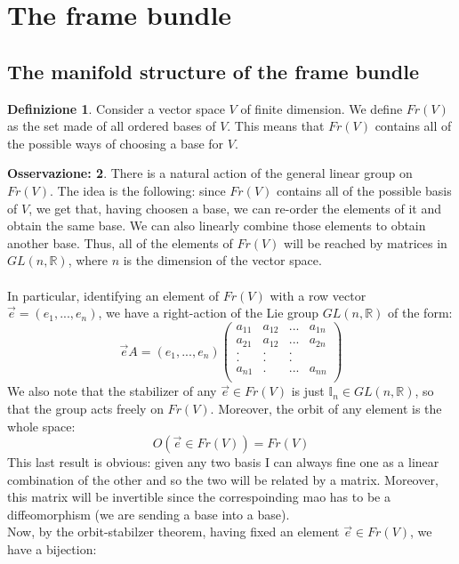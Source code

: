 \documentclass[12pt,a4paper]{report}
\theoremstyle{definition}
\newtheorem{Def}{Definizione}[chapter]
\theoremstyle{Theorem}
\theoremstyle{definition}
\theoremstyle{definition}
\theoremstyle{definition}
\newtheorem{Obs}[Def]{Osservazione:}
\begin{document}
	\section{The frame bundle}
	\subsection{The manifold structure of the frame bundle}
	\begin{Def}\label{Def_6.5}
		Consider a vector space $V$ of finite dimension. We define $Fr(V)$ as the set made of all ordered bases of $V$. This means that $Fr(V)$ contains all of the possible ways of choosing a base for $V$.
	\end{Def}
	\begin{Obs}
		There is a natural action of the general linear group on $Fr(V)$. The idea is the following: since $Fr(V)$ contains all of the possible basis of $V$, we get that, having choosen a base, we can re-order the elements of it and obtain the same base. We can also linearly combine those elements to obtain another base. Thus, all of the elements of $Fr(V)$ will be reached by matrices in $GL(n,\mathbb{R})$, where $n$ is the dimension of the vector space.\\
		\\
		In particular, identifying an element of $Fr(V)$ with a row vector $\vec{e}=(e_1,...,e_n)$, we have a right-action of the Lie group $GL(n,\mathbb{R})$ of the form:
		$$\vec{e}A=(e_1,...,e_n)\begin{pmatrix}
			a_{11}&a_{12}&...&a_{1n}\\
			a_{21}&a_{12}&...&a_{2n}\\
			.     &.     &.   &     \\
			.     &.     &.   &     \\
			a_{n1}&.     &...&a_{nn}\\
		\end{pmatrix}$$
		We also note that the stabilizer of any $\vec{e}\in Fr(V)$ is just $\mathbb{I}_n\in GL(n,\mathbb{R})$, so that the group acts freely on $Fr(V)$. Moreover, the orbit of any element is the whole space: 
		$$O(\vec{e}\in Fr(V))=Fr(V)$$
		This last result is obvious: given any two basis I can always fine one as a linear combination of the other and so the two will be related by a matrix. Moreover, this matrix will be invertible since the correspoinding mao has to be a diffeomorphism (we are sending a base into a base).\\
		Now, by the orbit-stabilzer theorem, having fixed an element $\vec{e}\in Fr(V)$, we have a bijection:

\end{Obs}
\end{document}
